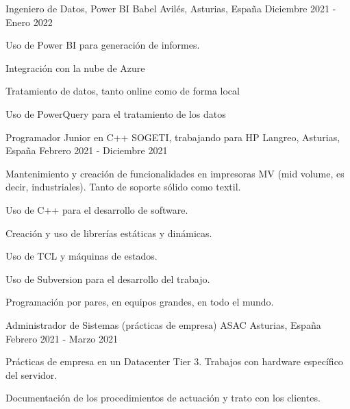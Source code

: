 \begin{cventries}
    \cventry
    {Ingeniero de Datos, Power BI} %
    {Babel} %
    {Avilés, Asturias, España} %
    {Diciembre 2021 - Enero 2022} %
    {
        \begin{cvitems} %
            \item {Uso de Power BI para generación de informes.}
            \item {Integración con la nube de Azure}
            \item {Tratamiento de datos, tanto online como de forma local}
            \item {Uso de PowerQuery para el tratamiento de los datos}
        \end{cvitems}
    }

    \cventry
    {Programador Junior en C++} %
    {SOGETI, trabajando para HP} %
    {Langreo, Asturias, España} %
    {Febrero 2021 - Diciembre 2021} %
    {
        \begin{cvitems} %
            \item {Mantenimiento y creación de funcionalidades en impresoras MV (mid volume, es decir, industriales).
                        Tanto de soporte sólido como textil.}
            \item {Uso de C++ para el desarrollo de software.}
            \item {Creación y uso de librerías estáticas y dinámicas.}
            \item {Uso de TCL y máquinas de estados.}
            \item {Uso de Subversion para el desarrollo del trabajo.}
            \item {Programación por pares, en equipos grandes, en todo el mundo.}
        \end{cvitems}
    }

    \cventry
    {Administrador de Sistemas (prácticas de empresa)} %
    {ASAC} %
    {Asturias, España} %
    {Febrero 2021 - Marzo 2021} %
    {
        \begin{cvitems} %
            \item {Prácticas de empresa en un Datacenter Tier 3. Trabajos con hardware específico del servidor.}
            \item {Documentación de los procedimientos de actuación y trato con los clientes.}
        \end{cvitems}
    }


\end{cventries}
